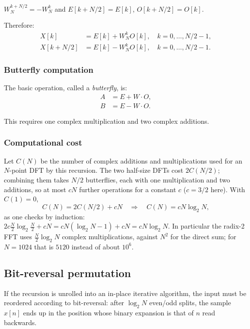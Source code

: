 \begin{notechapter}
\begin{lemma}
$W_N^{k+N/2} = -W_N^k$ and $E[k + N/2] = E[k]$, $O[k + N/2] = O[k]$.
\end{lemma}

Therefore:
\begin{align*}
X[k] &= E[k] + W_N^k O[k], \quad k = 0, \ldots, N/2-1, \\
X[k + N/2] &= E[k] - W_N^k O[k], \quad k = 0, \ldots, N/2-1.
\end{align*}

\subsubsection{Butterfly computation}

The basic operation, called a \emph{butterfly}, is:
\begin{align*}
A &= E + W \cdot O, \\
B &= E - W \cdot O.
\end{align*}

This requires one complex multiplication and two complex additions.

\subsubsection{Computational cost}

Let $C(N)$ be the number of complex additions and multiplications used for an $N$-point DFT by this recursion. The two half-size DFTs cost $2C(N/2)$; combining them takes $N/2$ butterflies, each with one multiplication and two additions, so at most $cN$ further operations for a constant $c$ ($c = 3/2$ here). With $C(1) = 0$,
\[
C(N) = 2C(N/2) + cN \quad\Longrightarrow\quad C(N) = cN\log_2 N,
\]
as one checks by induction: $2c\frac N2\log_2\frac N2 + cN = cN(\log_2 N - 1) + cN = cN\log_2 N$. In particular the radix-2 FFT uses $\frac N2\log_2 N$ complex multiplications, against $N^2$ for the direct sum; for $N = 1024$ that is $5120$ instead of about $10^6$.

\subsection{Bit-reversal permutation}

If the recursion is unrolled into an in-place iterative algorithm, the input must be reordered according to bit-reversal: after $\log_2 N$ even/odd splits, the sample $x[n]$ ends up in the position whose binary expansion is that of $n$ read backwards.


\end{notechapter}

